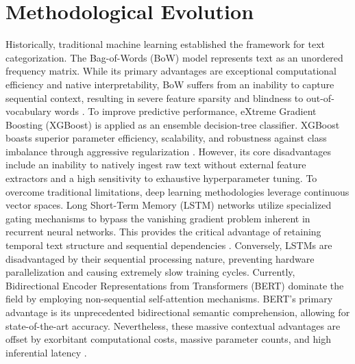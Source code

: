 \documentclass[11pt,a4paper]{article}
\begin{document}
\section*{Methodological Evolution}

Historically, traditional machine learning established the framework for text categorization. The Bag-of-Words (BoW) model represents text as an unordered frequency matrix. While its primary advantages are exceptional computational efficiency and native interpretability, BoW suffers from an inability to capture sequential context, resulting in severe feature sparsity and blindness to out-of-vocabulary words \citep{manning2008introduction}. To improve predictive performance, eXtreme Gradient Boosting (XGBoost) is applied as an ensemble decision-tree classifier. XGBoost boasts superior parameter efficiency, scalability, and robustness against class imbalance through aggressive regularization \citep{chen2016xgboost}. However, its core disadvantages include an inability to natively ingest raw text without external feature extractors and a high sensitivity to exhaustive hyperparameter tuning. To overcome traditional limitations, deep learning methodologies leverage continuous vector spaces. Long Short-Term Memory (LSTM) networks utilize specialized gating mechanisms to bypass the vanishing gradient problem inherent in recurrent neural networks. This provides the critical advantage of retaining temporal text structure and sequential dependencies \citep{hochreiter1997long}. Conversely, LSTMs are disadvantaged by their sequential processing nature, preventing hardware parallelization and causing extremely slow training cycles. Currently, Bidirectional Encoder Representations from Transformers (BERT) dominate the field by employing non-sequential self-attention mechanisms. BERT's primary advantage is its unprecedented bidirectional semantic comprehension, allowing for state-of-the-art accuracy. Nevertheless, these massive contextual advantages are offset by exorbitant computational costs, massive parameter counts, and high inferential latency \citep{devlin2019bert}.


\vspace{1em}


\end{document}
